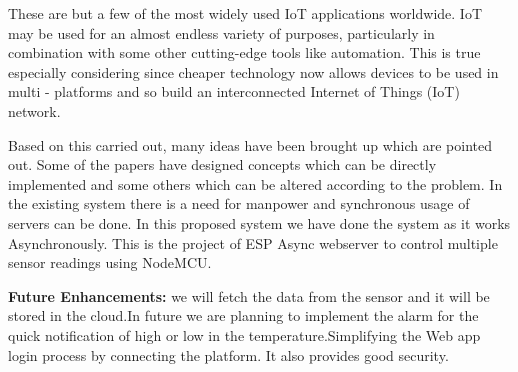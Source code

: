 \documentclass[12pt,a4paper,twocolumn,fleqn]{article}
\begin{document}
These are but a few of the most widely used IoT applications worldwide. IoT may be used for an almost endless variety of purposes, particularly in combination with some other cutting-edge tools like automation. This is true especially considering since cheaper technology now allows devices to be used in multi - platforms and so build an interconnected Internet of Things (IoT) network.

Based on this carried out, many ideas have been brought up which are pointed out. Some of the papers have designed concepts which can be directly implemented and some others which can be altered according to the problem. In the existing system there is a need for manpower and synchronous usage of servers can be done. In this proposed system we have done the system as it works Asynchronously. This is the project of ESP Async webserver to control multiple sensor readings using NodeMCU.\\ 

\item \textbf{Future Enhancements:} we will fetch the data from the sensor and it will be stored in the cloud.In future we are planning to implement the alarm for the quick notification of high or low in the temperature.Simplifying the Web app login process by connecting the platform. It also provides good security.
\end{document}

